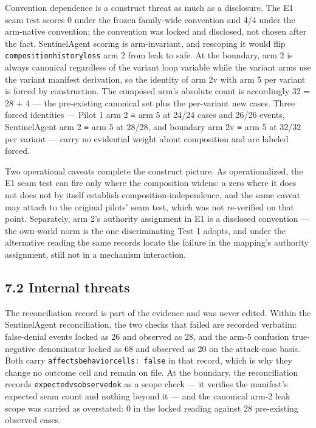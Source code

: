 \documentclass[
  10pt,
]{article}
\let\origtexttt\texttt
\renewcommand{\texttt}[1]{{\upshape\origtexttt{#1}}}
\renewcommand{\_}{\origunderscore\allowbreak}
\begin{document}
Convention dependence is a construct threat as much as a disclosure. The
E1 seam test scores 0 under the frozen family-wide convention and 4/4
under the arm-native convention; the convention was locked and
disclosed, not chosen after the fact. SentinelAgent scoring is
arm-invariant, and rescoping it would flip
\texttt{composition\_history\_loss} arm 2 from leak to safe. At the
boundary, arm 2 is always canonical regardless of the variant loop
variable while the variant arms use the variant manifest derivation, so
the identity of arm 2v with arm 5 per variant is forced by construction.
The composed arm's absolute count is accordingly 32 = 28 + 4 --- the
pre-existing canonical set plus the per-variant new cases. Three forced
identities --- Pilot 1 arm 2 ≡ arm 5 at 24/24 cases and 26/26 events,
SentinelAgent arm 2 ≡ arm 5 at 28/28, and boundary arm 2v ≡ arm 5 at
32/32 per variant --- carry no evidential weight about composition and
are labeled forced.

Two operational caveats complete the construct picture. As
operationalized, the E1 seam test can fire only where the composition
widens: a zero where it does not does not by itself establish
composition-independence, and the same caveat may attach to the original
pilots' seam test, which was not re-verified on that point. Separately,
arm 2's authority assignment in E1 is a disclosed convention --- the
own-world norm is the one discriminating Test 1 adopts, and under the
alternative reading the same records locate the failure in the mapping's
authority assignment, still not in a mechanism interaction.

\subsection{7.2 Internal threats}\label{internal-threats}

The reconciliation record is part of the evidence and was never edited.
Within the SentinelAgent reconciliation, the two checks that failed are
recorded verbatim: false-denial events locked as 26 and observed as 28,
and the arm-5 confusion true-negative denominator locked as 68 and
observed as 20 on the attack-case basis. Both carry
\texttt{affects\_behavior\_cells:\ false} in that record, which is why
they change no outcome cell and remain on file. At the boundary, the
reconciliation records \texttt{expected\_vs\_observed\_ok} as a scope
check --- it verifies the manifest's expected seam count and nothing
beyond it --- and the canonical arm-2 leak scope was carried as
overstated: 0 in the locked reading against 28 pre-existing observed
cases.
\end{document}
